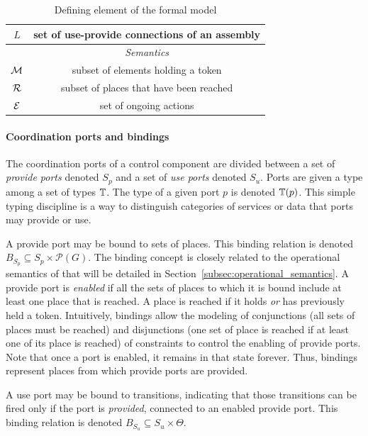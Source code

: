 \begin{table}[tp]
{\begin{tabular}{|c|c|}
      $L$ & set of use-provide connections of an assembly\\
      \hline
      \hline
      & \emph{Semantics}\\
      \hline
      $\mathcal{M}$ & subset of elements holding a token\\
      $\mathcal{R}$ & subset of places that have been reached\\
      $\mathcal{E}$ & set of ongoing actions\\
      \hline
    \end{tabular}
  }
  \caption{Defining element of the \mad formal model}
  \label{tab:not}
\end{table}

\paragraph{Coordination ports and bindings}{

The coordination ports of a control component are divided between a set of \emph{provide ports} denoted $S_p$ and a set of \emph{use ports} denoted $S_u$. Ports are given a type among a set of types $\mathbb{T}$. The type of a given port $p$ is denoted $\mathbb{T}(p)$. This simple typing discipline is a way to distinguish categories of services or data that ports may provide or use.

A provide port may be bound to sets of places. This binding relation is denoted $B_{S_p} \subseteq S_p \times \mathcal{P}(G)$. The binding concept is closely related to the operational semantics of \mad that will be detailed in Section~\ref{subsec:operational_semantics}. A provide port is \emph{enabled} if all the sets of places to which it is bound include at least one place that is reached. A place is reached if it holds \emph{or} has previously held a token. Intuitively, bindings allow the modeling of conjunctions (all sets of places must be reached) and disjunctions (one set of place is reached if at least one of its place is reached) of constraints to control the enabling of provide ports. Note that once a port is enabled, it remains in that state forever. Thus, bindings represent places from which provide ports are provided.

A use port may be bound to transitions, indicating that those transitions can be fired only if the port is \emph{provided}, \ie connected to an enabled provide port. This binding relation is denoted $B_{S_{u}} \subseteq S_u \times \Theta$.

}

